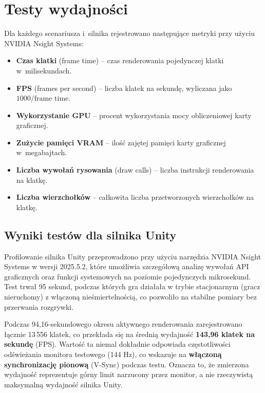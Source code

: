 \clearpage
\raggedbottom
\section{Testy wydajności}
\label{sec:testy-wydajnosci}

Dla każdego scenariusza i~silnika rejestrowano następujące metryki przy użyciu NVIDIA Nsight Systems:

\begin{itemize}
    \item \textbf{Czas klatki} (frame time) -- czas renderowania pojedynczej klatki w~milisekundach.
    \item \textbf{FPS} (frames per second) -- liczba klatek na sekundę, wyliczana jako $1000 / \text{frame time}$.
    \item \textbf{Wykorzystanie GPU} -- procent wykorzystania mocy obliczeniowej karty graficznej.
    \item \textbf{Zużycie pamięci VRAM} -- ilość zajętej pamięci karty graficznej w~megabajtach.
    \item \textbf{Liczba wywołań rysowania} (draw calls) -- liczba instrukcji renderowania na klatkę.
    \item \textbf{Liczba wierzchołków} -- całkowita liczba przetworzonych wierzchołków na klatkę.
\end{itemize}

\subsection{Wyniki testów dla silnika Unity}
\label{subsec:wyniki-unity}

Profilowanie silnika Unity przeprowadzono przy użyciu narzędzia NVIDIA Nsight Systems w wersji 2025.5.2, 
które umożliwia szczegółową analizę wywołań 
API graficznych oraz funkcji systemowych na poziomie pojedynczych mikrosekund. Test trwał 95 sekund, 
podczas których gra działała w 
trybie stacjonarnym (gracz nieruchomy) z włączoną nieśmiertelnością, co pozwoliło na stabilne pomiary 
bez przerwania rozgrywki.


Podczas 94,16-sekundowego okresu aktywnego renderowania zarejestrowano łącznie 13\,556 klatek, 
co przekłada się na średnią wydajność
\textbf{143,96 klatek na sekundę} (FPS). Wartość ta niemal dokładnie odpowiada częstotliwości 
odświeżania monitora testowego (144 Hz),
co wskazuje na \textbf{włączoną synchronizację pionową} (V-Sync) podczas testu. Oznacza to, 
że zmierzona wydajność reprezentuje
górny limit narzucony przez monitor, a nie rzeczywistą maksymalną wydajność silnika Unity.


